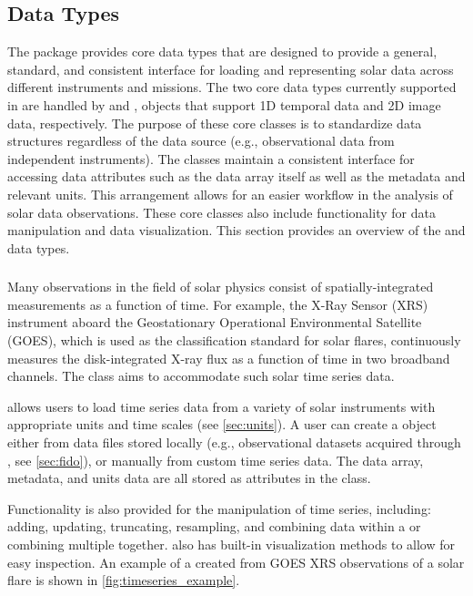 \subsection{Data Types}
\label{sec:data_types}

The \sunpypkg package provides core data types that are designed to provide a general, standard, and consistent interface for loading and representing solar data across different instruments and missions.
The two core data types currently supported in \sunpypkg are handled by \Timeseries and \Map, objects that support 1D temporal data and 2D image data, respectively.
The purpose of these core classes is to standardize data structures regardless of the data source (e.g., observational data from independent instruments).
The classes maintain a consistent interface for accessing data attributes such as the data array itself as well as the metadata and relevant units.
This arrangement allows for an easier workflow in the analysis of solar data observations.
These core classes also include functionality for data manipulation and data visualization.
This section provides an overview of the \Timeseries and \Map data types.

\subsubsection{\Timeseries}
\label{sec:timeseries}
Many observations in the field of solar physics consist of spatially-integrated measurements as a function of time.
For example, the X-Ray Sensor (XRS) instrument aboard the Geostationary Operational Environmental Satellite (GOES), which is used as the classification standard for solar flares, continuously measures the disk-integrated X-ray flux as a function of time in two broadband channels.
The \Timeseries class aims to accommodate such solar time series data.

\Timeseries allows users to load time series data from a variety of solar instruments with appropriate units and time scales (see \autoref{sec:units}).
 A user can create a \Timeseries object either from data files stored locally (e.g., observational datasets acquired through \Fido, see \autoref{sec:fido}), or manually from custom time series data.
 The data array, metadata, and units data are all stored as attributes in the \Timeseries class.

Functionality is also provided for the manipulation of time series, including: adding, updating, truncating, resampling, and combining data within a \Timeseries or combining multiple \Timeseries together.
\Timeseries also has built-in visualization methods to allow for easy inspection.
An example of a \Timeseries created from GOES XRS observations of a solar flare is shown in \autoref{fig:timeseries_example}.

